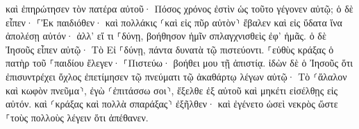 \documentclass{openreader}
\begin{document}
καὶ ἐπηρώτησεν τὸν πατέρα αὐτοῦ· Πόσος χρόνος ἐστὶν ὡς τοῦτο γέγονεν αὐτῷ; ὁ δὲ εἶπεν· ⸀Ἐκ παιδιόθεν· 
καὶ πολλάκις ⸂καὶ εἰς πῦρ αὐτὸν⸃ ἔβαλεν καὶ εἰς ὕδατα ἵνα ἀπολέσῃ αὐτόν· ἀλλ’ εἴ τι ⸀δύνῃ, βοήθησον ἡμῖν σπλαγχνισθεὶς ἐφ’ ἡμᾶς. 
ὁ δὲ Ἰησοῦς εἶπεν αὐτῷ· Τὸ Εἰ ⸀δύνῃ, πάντα δυνατὰ τῷ πιστεύοντι. 
⸀εὐθὺς κράξας ὁ πατὴρ τοῦ ⸀παιδίου ἔλεγεν· ⸀Πιστεύω· βοήθει μου τῇ ἀπιστίᾳ. 
ἰδὼν δὲ ὁ Ἰησοῦς ὅτι ἐπισυντρέχει ὄχλος ἐπετίμησεν τῷ πνεύματι τῷ ἀκαθάρτῳ λέγων αὐτῷ· Τὸ ⸂ἄλαλον καὶ κωφὸν πνεῦμα⸃, ἐγὼ ⸂ἐπιτάσσω σοι⸃, ἔξελθε ἐξ αὐτοῦ καὶ μηκέτι εἰσέλθῃς εἰς αὐτόν. 
καὶ ⸂κράξας καὶ πολλὰ σπαράξας⸃ ἐξῆλθεν· καὶ ἐγένετο ὡσεὶ νεκρὸς ὥστε ⸀τοὺς πολλοὺς λέγειν ὅτι ἀπέθανεν. 
\end{document}
